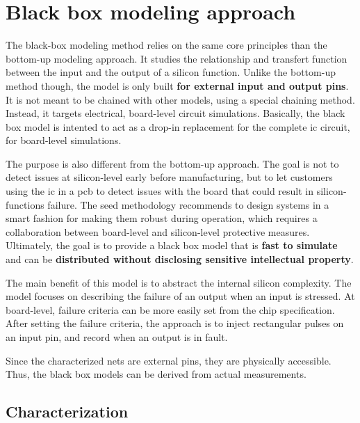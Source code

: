 \section{Black box modeling approach}

The black-box modeling method relies on the same core principles than the bottom-up modeling approach.
It studies the relationship and transfert function between the input and the output of a silicon function.
Unlike the bottom-up method though, the model is only built \textbf{for external input and output pins}.
It is not meant to be chained with other models, using a special chaining method.
Instead, it targets electrical, board-level circuit simulations.
Basically, the black box model is intented to act as a drop-in replacement for the complete \gls{ic} circuit, for board-level simulations.

The purpose is also different from the bottom-up approach.
The goal is not to detect issues at silicon-level early before manufacturing, but to let customers using the \gls{ic} in a \gls{pcb} to detect issues with the board that could result in silicon-functions failure.
The \gls{seed} methodology recommends to design systems in a smart fashion for making them robust during operation, which requires a collaboration between board-level and silicon-level protective measures.
Ultimately, the goal is to provide a black box model that is \textbf{fast to simulate} and can be \textbf{distributed without disclosing sensitive intellectual property}.

The main benefit of this model is to abstract the internal silicon complexity.
The model focuses on describing the failure of an output when an input is stressed.
At board-level, failure criteria can be more easily set from the chip specification.
After setting the failure criteria, the approach is to inject rectangular pulses on an input pin, and record when an output is in fault.

Since the characterized nets are external pins, they are physically accessible.
Thus, the black box models can be derived from actual measurements.

\subsection{Characterization}

